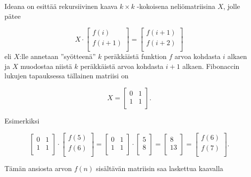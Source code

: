 Ideana on esittää rekursiivinen kaava $k \times k$
-kokoisena neliömatriisina $X$, jolle pätee

\[ X \cdot
 \begin{bmatrix}
  f(i) \\
  f(i+1) \\
 \end{bmatrix}
=
 \begin{bmatrix}
  f(i+1) \\
  f(i+2) \\
 \end{bmatrix}
 \]
eli $X$:lle annetaan
''syötteenä'' $k$ peräkkäistä funktion $f$ arvoa
kohdasta $i$ alkaen ja $X$ muodostaa niistä
$k$ peräkkäistä arvoa kohdasta $i+1$ alkaen.
Fibonaccin lukujen tapauksessa tällainen matriisi on

\[ X = 
 \begin{bmatrix}
  0 & 1 \\
  1 & 1 \\
 \end{bmatrix}.
\]

Esimerkiksi

\[
 \begin{bmatrix}
  0 & 1 \\
  1 & 1 \\
 \end{bmatrix}
\cdot
 \begin{bmatrix}
  f(5) \\
  f(6) \\
 \end{bmatrix}
=
 \begin{bmatrix}
  0 & 1 \\
  1 & 1 \\
 \end{bmatrix}
\cdot
 \begin{bmatrix}
  5 \\
  8 \\
 \end{bmatrix}
=
 \begin{bmatrix}
  8 \\
  13 \\
 \end{bmatrix}
=
 \begin{bmatrix}
  f(6) \\
  f(7) \\
 \end{bmatrix}.
\]

Tämän ansiosta arvon $f(n)$ sisältävän matriisin saa laskettua
kaavalla

